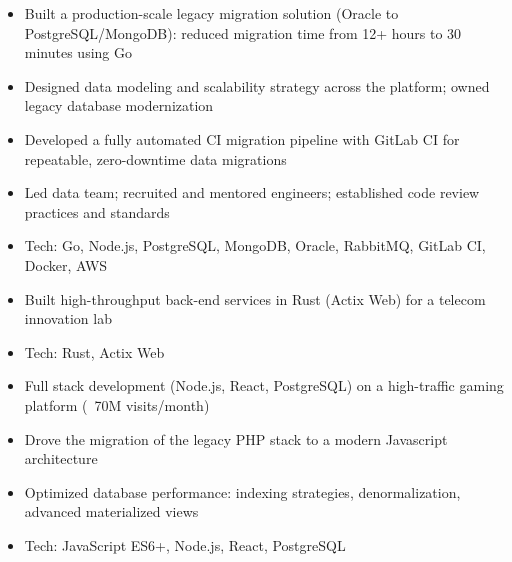 \begin{minipage}{.9\textwidth}
    \raggedright
    \begin{itemize}
        \item Built a production-scale legacy migration solution (Oracle to PostgreSQL/MongoDB): reduced migration time from 12+ hours to 30 minutes using Go
        \item Designed data modeling and scalability strategy across the platform; owned legacy database modernization
        \item Developed a fully automated CI migration pipeline with GitLab CI for repeatable, zero-downtime data migrations
        \item Led data team; recruited and mentored engineers; established code review practices and standards
        \item Tech: Go, Node.js, PostgreSQL, MongoDB, Oracle, RabbitMQ, GitLab CI, Docker, AWS
    \end{itemize}
\end{minipage}

\begin{minipage}{.9\textwidth}
    \raggedright
    \begin{itemize}
        \item Built high-throughput back-end services in Rust (Actix Web) for a telecom innovation lab
        \item Tech: Rust, Actix Web
    \end{itemize}
\end{minipage}

\begin{minipage}{.9\textwidth}
    \raggedright
    \begin{itemize}
        \item Full stack development (Node.js, React, PostgreSQL) on a high-traffic gaming platform (~70M visits/month)
        \item Drove the migration of the legacy PHP stack to a modern Javascript architecture
        \item Optimized database performance: indexing strategies, denormalization, advanced materialized views
        \item Tech: JavaScript ES6+, Node.js, React, PostgreSQL
    \end{itemize}
\end{minipage}
